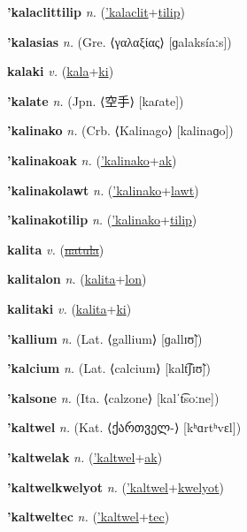 \textbf{\hypertarget{'kalaclittilip}{'kalaclittilip}} \textit{n.} (\hyperlink{'kalaclit}{'kalaclit}+\allowbreak \hyperlink{tilip}{tilip})


\textbf{\hypertarget{'kalasias}{'kalasias}} \textit{n.} (Gre. ⟨γαλαξίας⟩ [ɡalaksíaːs])


\textbf{\hypertarget{kalaki}{kalaki}} \textit{v.} (\hyperlink{kala}{kala}+\allowbreak \hyperlink{ki}{ki})


\textbf{\hypertarget{'kalate}{'kalate}} \textit{n.} (Jpn. ⟨{\japanese{}空手}⟩ [kaɾate])


\textbf{\hypertarget{'kalinako}{'kalinako}} \textit{n.} (Crb. ⟨Kalinago⟩ [kalinaɡo])


\textbf{\hypertarget{'kalinakoak}{'kalinakoak}} \textit{n.} (\hyperlink{'kalinako}{'kalinako}+\allowbreak \hyperlink{ak}{ak})


\textbf{\hypertarget{'kalinakolawt}{'kalinakolawt}} \textit{n.} (\hyperlink{'kalinako}{'kalinako}+\allowbreak \hyperlink{lawt}{lawt})


\textbf{\hypertarget{'kalinakotilip}{'kalinakotilip}} \textit{n.} (\hyperlink{'kalinako}{'kalinako}+\allowbreak \hyperlink{tilip}{tilip})


\textbf{\hypertarget{kalita}{kalita}} \textit{v.} (\hyperlink{natula}{\sout{natula}})


\textbf{\hypertarget{kalitalon}{kalitalon}} \textit{n.} (\hyperlink{kalita}{kalita}+\allowbreak \hyperlink{lon}{lon})


\textbf{\hypertarget{kalitaki}{kalitaki}} \textit{v.} (\hyperlink{kalita}{kalita}+\allowbreak \hyperlink{ki}{ki})


\textbf{\hypertarget{'kallium}{'kallium}} \textit{n.} (Lat. ⟨gallium⟩ [ɡallɪʊ̃])


\textbf{\hypertarget{'kalcium}{'kalcium}} \textit{n.} (Lat. ⟨calcium⟩ [kalt͡ʃɪʊ̃])


\textbf{\hypertarget{'kalsone}{'kalsone}} \textit{n.} (Ita. ⟨calzone⟩ [kalˈt͡soːne])


\textbf{\hypertarget{'kaltwel}{'kaltwel}} \textit{n.} (Kat. ⟨{\georgian{}ქართველ-}⟩ [kʰɑrtʰvɛl])


\textbf{\hypertarget{'kaltwelak}{'kaltwelak}} \textit{n.} (\hyperlink{'kaltwel}{'kaltwel}+\allowbreak \hyperlink{ak}{ak})


\textbf{\hypertarget{'kaltwelkwelyot}{'kaltwelkwelyot}} \textit{n.} (\hyperlink{'kaltwel}{'kaltwel}+\allowbreak \hyperlink{kwelyot}{kwelyot})


\textbf{\hypertarget{'kaltweltec}{'kaltweltec}} \textit{n.} (\hyperlink{'kaltwel}{'kaltwel}+\allowbreak \hyperlink{tec}{tec})


